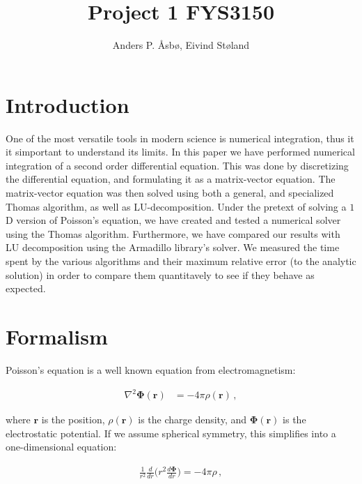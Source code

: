 \documentclass[english,notitlepage,reprint,nofootinbib]{revtex4-1}  %
\begin{document}
\title{Project 1 FYS3150}   %
\author{Anders P. Åsbø, Eivind Støland}               %

\noaffiliation                            %

\maketitle
\tableofcontents

\section{Introduction} \label{sec:I}

One of the most versatile tools in modern science is numerical integration, thus it it simportant to understand its limits. In this paper we have performed numerical integration of a second order differential equation. This was done by discretizing the differential equation, and formulating it as a matrix-vector equation. The matrix-vector equation was then solved using both a general, and specialized Thomas algorithm, as well as LU-decomposition. Under the pretext of solving a \(1\)D version of Poisson's equation, we have created and tested a numerical solver using the Thomas algorithm. Furthermore, we have compared our results with LU decomposition using the Armadillo library's solver. We measured the time spent by the various algorithms and their maximum relative error (to the analytic solution) in order to compare them quantitavely to see if they behave as expected.





\section{Formalism} \label{sec:II}

Poisson's equation is a well known equation from electromagnetism:

\begin{align*}
\nabla^2 \boldsymbol\Phi (\boldsymbol r) &= -4\pi \rho (\boldsymbol r) \, ,
\end{align*}

where $\boldsymbol r$ is the position, $\rho(\boldsymbol r)$ is the charge density, and $\boldsymbol \Phi (\boldsymbol r)$ is the electrostatic potential. If we assume spherical symmetry, this simplifies into a one-dimensional equation:

\begin{align*}
\frac{1}{r^2} \frac{d}{dr} \bigg(r^2 \frac{d\boldsymbol \Phi}{dr} \bigg) = - 4\pi \rho \, ,
\end{align*}
\end{document}
